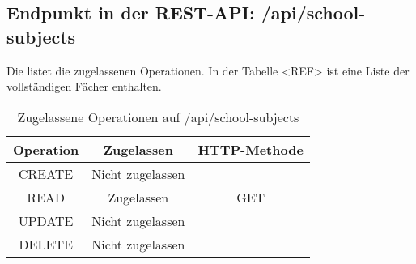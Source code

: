 \subsection{Endpunkt in der REST-API: /api/school-subjects}
\label{sec:end:rest:api:school-subjects}
Die  listet die zugelassenen Operationen. 
In der Tabelle <REF> ist eine Liste der vollständigen Fächer enthalten.


\begin{table}[!htbp]
	\begin{tabular}{|c|c|c|}
		\hline
			\textbf{Operation} & \textbf{Zugelassen} & \textbf{HTTP-Methode} \\ \hline
			CREATE & Nicht zugelassen & \\ \hline 
			READ & Zugelassen & GET \\ \hline
			UPDATE & Nicht zugelassen & \\ \hline 
			DELETE & Nicht zugelassen & \\ \hline
	\end{tabular}

		\caption{Zugelassene Operationen auf /api/school-subjects}
		\label{tab:end:rest:api:school-subjects:meth}
\end{table}





